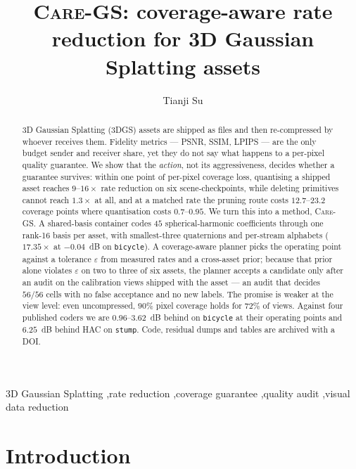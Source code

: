 \documentclass[preprint,number,3p]{elsarticle}
\newcommand{\care}{\textsc{Care-GS}}
\begin{document}
\begin{frontmatter}

\title{\care{}: coverage-aware rate reduction for 3D Gaussian Splatting assets}

\author[nbu]{Tianji Su}
\address[nbu]{Ningbo University, Ningbo, China}

\begin{abstract}
3D Gaussian Splatting (3DGS) assets are shipped as files and then re-compressed by whoever receives them. Fidelity
metrics --- PSNR, SSIM, LPIPS --- are the only budget sender and receiver share, yet they do not say what happens to a
per-pixel quality guarantee. We show that the \emph{action}, not its aggressiveness, decides whether a guarantee
survives: within one point of per-pixel coverage loss, quantising a shipped asset reaches $9$--$16\times$ rate
reduction on six scene-checkpoints, while deleting primitives cannot reach $1.3\times$ at all, and at a matched rate
the pruning route costs $12.7$--$23.2$ coverage points where quantisation costs $0.7$--$0.95$. We turn this into a
method, \care{}. A shared-basis container codes $45$ spherical-harmonic coefficients through one rank-16 basis per
asset, with smallest-three quaternions and per-stream alphabets ($17.35\times$ at $-0.04$~dB on \texttt{bicycle}). A
coverage-aware planner picks the operating point against a tolerance $\varepsilon$ from measured rates and a
cross-asset prior; because that prior alone violates $\varepsilon$ on two to three of six assets, the planner accepts a
candidate only after an audit on the calibration views shipped with the asset --- an audit that decides $56/56$ cells
with no false acceptance and no new labels. The promise is weaker at the view level: even uncompressed, $90\%$
pixel coverage holds for $72\%$ of views. Against four published coders we are $0.96$--$3.62$~dB behind on
\texttt{bicycle} at their operating points and $6.25$~dB behind HAC on \texttt{stump}. Code, residual dumps and tables are archived with a DOI.
\end{abstract}

\begin{keyword}
3D Gaussian Splatting \sep rate reduction \sep coverage guarantee \sep quality audit \sep visual data reduction
\end{keyword}

\end{frontmatter}

\section{Introduction}
\label{sec:intro}
\end{document}
